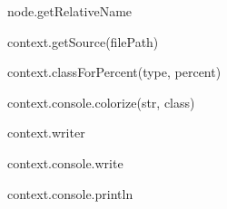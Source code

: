 \href{https://greenkeeper.io/}{\tt } \href{https://travis-ci.org/istanbuljs/istanbul-reports}{\tt }


\begin{DoxyItemize}
\item node.\+get\+Relative\+Name
\item context.\+get\+Source(file\+Path)
\item context.\+class\+For\+Percent(type, percent)
\item context.\+console.\+colorize(str, class)
\item context.\+writer
\item context.\+console.\+write
\item context.\+console.\+println 
\end{DoxyItemize}